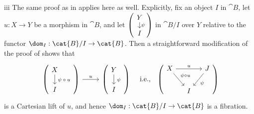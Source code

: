\begin{partsolution}{iii}
The same proof as in  applies here as well.
Explicitly, fix an object \(I\) in \(\cat{B}\), let \(u : X \to Y\) be a morphism in \(\cat{B}\), and let \(\begin{pmatrix}\begin{tikzcd}[row sep=small] Y \arrow[d, "\psi"] \\ I\end{tikzcd}\end{pmatrix}\) in \(\cat{B} / I\) over \(Y\) relative to the functor \(\dom_I : \cat{B} / I \to \cat{B}\).
Then a straightforward modification of the proof of  shows that
\begin{align*}
\begin{tikzcd}[ampersand replacement=\&,]
\begin{pmatrix}
\begin{tikzpicture}
        \node(1){\(X\)}; 
        \node(2)[below of=1]{\(I\)};
        \draw[->](1)--node[right]{\scriptsize\(\psi \circ u\)} (2);
\end{tikzpicture}
\end{pmatrix}
\arrow[r, "u"]
\&
\begin{pmatrix}
\begin{tikzpicture}
        \node(1){\(Y\)};
        \node(2)[below of=1]{\(I\)};
        \draw[->](1)--node[right]{\scriptsize\(\psi\)} (2);
\end{tikzpicture}
\end{pmatrix}
\end{tikzcd}&& \text{i.e.,}
&&
\begin{pmatrix}
\begin{tikzcd}[ampersand replacement=\&, column sep=small]
X \arrow[rr, "u"] \arrow[dr, "\psi \circ u"] \& \& J \arrow[dl, "\psi"] \\
\& I
\end{tikzcd}
\end{pmatrix}
\end{align*}
is a Cartesian lift of \(u\), and hence \(\dom_I : \cat{B} / I \to \cat{B}\) is a fibration.
\end{partsolution}